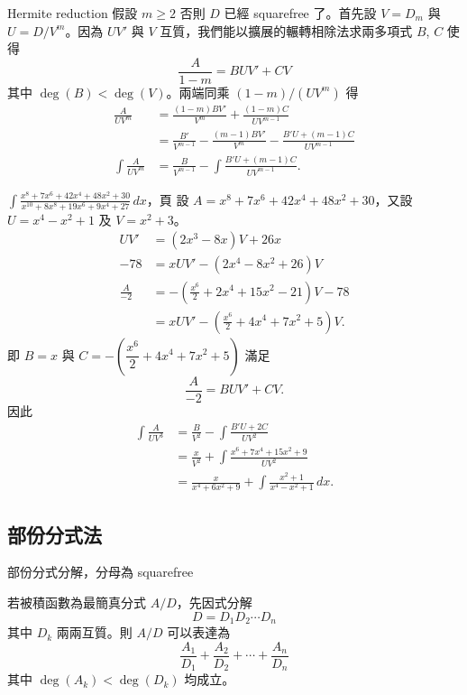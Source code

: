 \documentclass{beamer}
\theoremstyle{remark}
\begin{document}
\begin{CJK}{UTF8}{bsmi}
\begin{frame}{Hermite reduction}
  假設 $m \ge 2$ 否則 $D$ 已經 squarefree 了。首先設 $V = D_m$ 與 $U = D/V^m$。因為 $UV'$ 與 $V$
  互質，我們能以擴展的輾轉相除法求兩多項式 $B$, $C$ 使得
  \[\frac{A}{1-m} = BUV' + CV\]
  其中 $\deg(B) < \deg(V)$。兩端同乘 $(1-m)/(UV^m)$ 得
  \begin{align*}
    \frac{A}{UV^m} &= \frac{\left( 1-m \right) BV'}{V^m} + \frac{\left( 1-m \right) C}{UV^{m-1}}\\
      &= \frac{B'}{V^{m-1}} - \frac{\left( m-1 \right) BV'}{V^m} - \frac{B'U + \left( m-1 \right) C}{UV^{m-1}}\\
    \int \frac{A}{UV^m} &= \frac{B}{V^{m-1}} - \int \frac{B'U + \left( m-1 \right) C}{UV^{m-1}}.
  \end{align*}
\end{frame}

\begin{frame}[allowframebreaks]{$\displaystyle \int \frac{x^8 + 7x^6 + 42x^4 + 48x^2 + 30}
    {x^{10} + 8x^8 + 19x^6 + 9x^4 + 27}\,dx$，頁}
  設 $A = x^8 + 7x^6 + 42x^4 + 48x^2 + 30$，又設 $U = x^4 - x^2 + 1$ 及 $V = x^2 + 3$。
  \begin{align*}
    UV'  &= \left( 2x^3 - 8x \right) V + 26x\\
    -78  &= xUV' -  \left( 2x^4 - 8x^2 + 26 \right) V\\
    \frac{A}{-2} &= - \left( \frac{x^6}{2} + 2x^4 + 15x^2 - 21 \right) V - 78\\
	 &= xUV' - \left( \frac{x^6}{2} + 4x^4 + 7x^2 + 5 \right) V.
  \end{align*}
  即 $B = x$ 與 $C = - \left( \dfrac{x^6}{2} + 4x^4 + 7x^2 + 5 \right)$ 滿足
  \[\frac{A}{-2} = BUV' + CV.\]
  因此
  \begin{align*}
    \int \frac{A}{UV^3} &= \frac{B}{V^2} - \int \frac{B'U + 2C}{UV^2}\\
      &= \frac{x}{V^2} + \int \frac{x^6 + 7x^4 + 15x^2 + 9}{UV^2}\\
      &= \frac{x}{x^4 + 6x^2 + 9} + \int \frac{x^2 + 1}{x^4 - x^2 + 1}\,dx.
  \end{align*}
\end{frame}

\subsection{部份分式法}
\begin{frame}{部份分式分解，分母為 squarefree}
  \begin{theorem}
    若被積函數為最簡真分式 $A/D$，先因式分解
    \[D = D_1 D_2 \cdots D_n\]
    其中 $D_k$ 兩兩互質。則 $A/D$ 可以表達為
    \[\frac{A_1}{D_1} + \frac{A_2}{D_2} + \cdots + \frac{A_n}{D_n}\]
    其中 $\deg(A_k) < \deg(D_k)$ 均成立。
  \end{theorem}
\end{frame}


\end{CJK}
\end{document}
